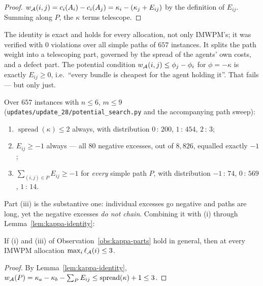 \begin{proof}
$w_{\mathcal{A}}(i,j) = c_i(A_{i}) - c_i(A_{j}) = \kappa_i -
(\kappa_j + E_{ij})$ by the definition of $E_{ij}$. Summing along $P$, the
$\kappa$ terms telescope.
\end{proof}

The identity is exact and holds for every allocation, not only IMWPM's; it was
verified with $0$ violations over all simple paths of $657$ instances. It splits
the path weight into a telescoping part, governed by the spread of the agents'
own costs, and a defect part. The potential condition $w_{\mathcal{A}}(i,j) \le
\phi_j - \phi_i$ for $\phi = -\kappa$ is exactly $E_{ij} \ge 0$, i.e.\ ``every
bundle is cheapest for the agent holding it''. That fails --- but only just.

\begin{observation}
\label{obs:kappa-parts}
Over $657$ instances with $n \le 6$, $m \le 9$
(\texttt{updates/update\_28/potential\_search.py} and the accompanying path sweep):
\begin{enumerate}
  \item[(i)] $\operatorname{spread}(\kappa) \le 2$ always, with distribution
    $0\,{:}\,200$, $1\,{:}\,454$, $2\,{:}\,3$;
  \item[(ii)] $E_{ij} \ge -1$ always --- all $80$ negative excesses, out of
    $8{,}826$, equalled exactly $-1$;
  \item[(iii)] $\sum_{(i,j) \in P} E_{ij} \ge -1$ for \emph{every} simple path
    $P$, with distribution $-1\,{:}\,74$, $0\,{:}\,569$, $1\,{:}\,14$.
\end{enumerate}
\end{observation}

Part (iii) is the substantive one: individual excesses go negative and paths are
long, yet the negative excesses \emph{do not chain}. Combining it with (i)
through Lemma~\ref{lem:kappa-identity}:

\begin{corollary}
\label{cor:constant-bound}
If (i) and (iii) of Observation~\ref{obs:kappa-parts} hold in general, then at
every IMWPM allocation $\max_i \ell_{\mathcal{A}}(i) \le 3$.
\end{corollary}

\begin{proof}
By Lemma~\ref{lem:kappa-identity}, $w_{\mathcal{A}}(P) = \kappa_a - \kappa_b -
\sum_P E_{ij} \le \operatorname{spread}(\kappa) + 1 \le 3$.
\end{proof}

